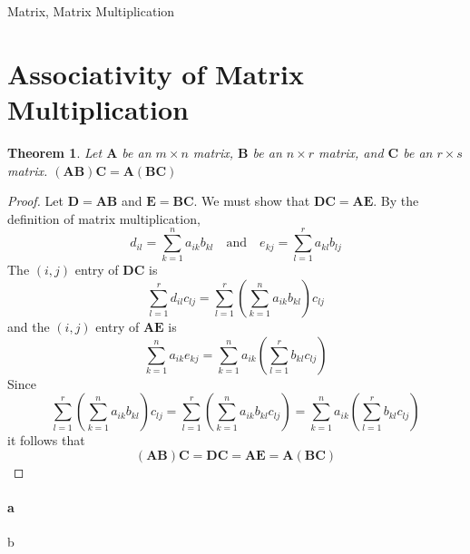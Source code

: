 \documentclass[preprint,12pt]{elsarticle}
\newcommand{\bA}{\mathbf{A}}
\newcommand{\bB}{\mathbf{B}}
\newcommand{\bC}{\mathbf{C}}
\newcommand{\bD}{\mathbf{D}}
\newcommand{\bE}{\mathbf{E}}
\newtheorem{theorem}{Theorem}[section]
\begin{document}
\begin{frontmatter}
  \begin{keyword}
    Matrix\sep
    Matrix Multiplication



  \end{keyword}

\end{frontmatter}


\section{Associativity of Matrix Multiplication}

\begin{theorem}Let $\bA{}$ be an $m\times n$ matrix, $\bB{}$ be an $n\times r$ matrix, and $\bC$ be an $r\times s$ matrix.
  $(\bA{}\bB{})\bC{}=\bA{}(\bB{}\bC{})$
\end{theorem}
\begin{proof}
  Let $\bD{}=\bA{}\bB{}$ and $\bE{}=\bB{}\bC{}$.
  We must show that $\bD{}\bC{}=\bA{}\bE{}$.
  By the definition of matrix multiplication,
  $$
  d_{il}=\sum_{k=1}^{n}a_{ik}b_{kl}\quad\text{and}\quad e_{kj}=\sum_{l=1}^{r}a_{kl}b_{lj}
  $$
  The $(i,j)$ entry of $\bD{}\bC{}$ is
  $$
  \sum_{l=1}^{r}d_{il}c_{lj}=\sum_{l=1}^{r}\left(\sum_{k=1}^{n}a_{ik}b_{kl}\right)c_{lj}
  $$
  and the $(i,j)$ entry of $\bA{}\bE{}$ is
  $$
  \sum_{k=1}^{n}a_{ik}e_{kj}=\sum_{k=1}^{n}a_{ik}\left(\sum_{l=1}^{r}b_{kl}c_{lj}\right)
  $$
  Since
  $$
  \sum_{l=1}^{r}\left(\sum_{k=1}^{n}a_{ik}b_{kl}\right)c_{lj}
  =\sum_{l=1}^{r}\left(\sum_{k=1}^{n}a_{ik}b_{kl}c_{lj}\right)
  = \sum_{k=1}^{n}a_{ik}\left(\sum_{l=1}^{r}b_{kl}c_{lj}\right)
  $$
  it follows that
  $$
  (\bA{}\bB{})\bC{}=\bD{}\bC{}=\bA\bE{}=\bA{}(\bB{}\bC{})
  $$
\end{proof}
\paragraph{a}b
\end{document}
